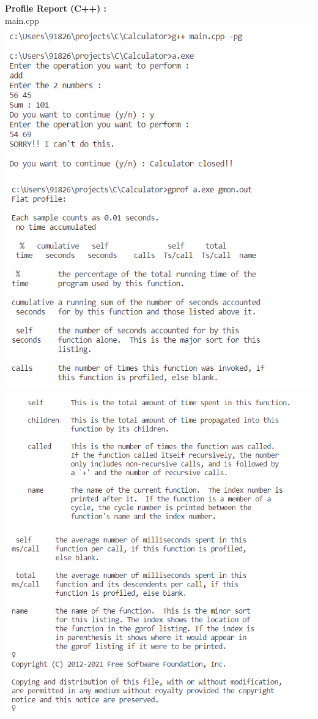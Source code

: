 \documentclass{article}
\begin{document}
\textbf{\bf Profile Report (C++) : \\}
main.cpp\\
\includegraphics[scale=0.70]{cpp_main_prof_01}\\
\includegraphics[scale=0.70]{cpp_main_prof_02}\\
\includegraphics[scale=0.70]{cpp_main_prof_03}\\
\includegraphics[scale=0.70]{cpp_main_prof_04}\\
\end{document}
